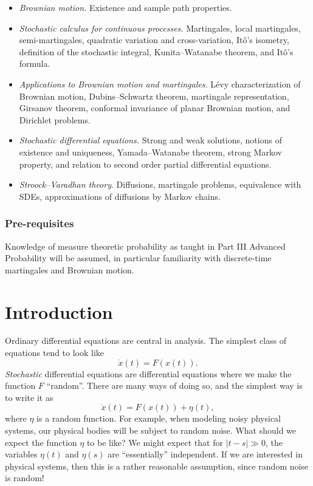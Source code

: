 \documentclass[a4paper]{article}
\begin{document}
\maketitle
{\small
\setlength{\parindent}{0em}
\setlength{\parskip}{1em}
\begin{itemize}
  \item \textit{Brownian motion.} Existence and sample path properties.
  \item \textit{Stochastic calculus for continuous processes.} Martingales, local martingales, semi-martingales, quadratic variation and cross-variation, It\^o's isometry, definition of the stochastic integral, Kunita--Watanabe theorem, and It\^o's formula.
  \item \textit{Applications to Brownian motion and martingales.} L\'evy characterization of Brownian motion, Dubins--Schwartz theorem, martingale representation, Girsanov theorem, conformal invariance of planar Brownian motion, and Dirichlet problems.
  \item \textit{Stochastic differential equations.} Strong and weak solutions, notions of existence and uniqueness, Yamada--Watanabe theorem, strong Markov property, and relation to second order partial differential equations.
  \item \textit{Stroock--Varadhan theory}. Diffusions, martingale problems, equivalence with SDEs, approximations of diffusions by Markov chains.
\end{itemize}
\subsubsection*{Pre-requisites}
Knowledge of measure theoretic probability as taught in Part III Advanced Probability will be assumed, in particular familiarity with discrete-time martingales and Brownian motion.
}
\tableofcontents

\setcounter{section}{-1}
\section{Introduction}
Ordinary differential equations are central in analysis. The simplest class of equations tend to look like
\[
  \dot{x}(t) = F(x(t)).
\]
\emph{Stochastic} differential equations are differential equations where we make the function $F$ ``random''. There are many ways of doing so, and the simplest way is to write it as
\[
  \dot{x}(t) = F(x(t)) + \eta(t),
\]
where $\eta$ is a random function. For example, when modeling noisy physical systems, our physical bodies will be subject to random noise. What should we expect the function $\eta$ to be like? We might expect that for $|t - s| \gg 0$, the variables $\eta(t)$ and $\eta(s)$ are ``essentially'' independent. If we are interested in physical systems, then this is a rather reasonable assumption, since random noise is random!
\end{document}
